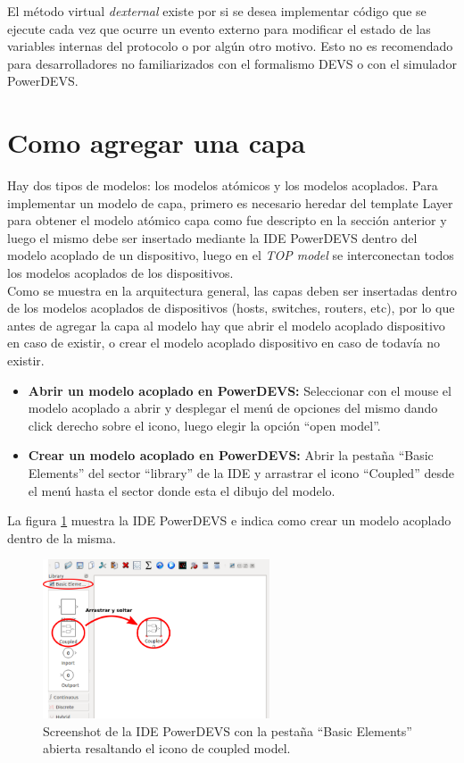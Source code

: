 \documentclass[10pt,a4paper]{article}
\begin{document}
El método virtual \textit{dexternal} existe por si se desea implementar código que se ejecute cada vez que ocurre un evento externo para modificar el estado de las variables internas del protocolo o por algún otro motivo. Esto no es recomendado para desarrolladores no familiarizados con el formalismo DEVS o con el simulador PowerDEVS. \\

\section{Como agregar una capa}

Hay dos tipos de modelos: los modelos atómicos y los modelos acoplados. Para implementar un modelo de capa, primero es necesario heredar del template Layer para obtener el modelo atómico capa como fue descripto en la sección anterior y luego el mismo debe ser insertado mediante la IDE PowerDEVS dentro del modelo acoplado de un dispositivo, luego en el \textit{TOP model} se interconectan todos los modelos acoplados de los dispositivos. \\

Como se muestra en la arquitectura general, las capas deben ser insertadas dentro de los modelos acoplados de dispositivos (hosts, switches, routers, etc), por lo que antes de agregar la capa al modelo hay que abrir el modelo acoplado dispositivo en caso de existir, o crear el modelo acoplado dispositivo en caso de todavía no existir.

\begin{itemize}
\item \textbf{Abrir un modelo acoplado en PowerDEVS:} Seleccionar con el mouse el modelo acoplado a abrir y desplegar el menú de opciones del mismo dando click derecho sobre el icono, luego elegir la opción ``open model''.
\item \textbf{Crear un modelo acoplado en PowerDEVS: } Abrir la pestaña ``Basic Elements'' del sector ``library'' de la IDE y arrastrar el icono ``Coupled'' desde el menú hasta el sector donde esta el dibujo del modelo.
\end{itemize}

La figura \ref{figure: PowerDEVS IDE} muestra la IDE PowerDEVS e indica como crear un modelo acoplado dentro de la misma. \\

\begin{figure}[htbp]
    \centering
    \includegraphics[width = 0.6\textwidth]{img/png/powerDEVS_coupled.png}
    \caption{Screenshot de la IDE PowerDEVS con la pestaña ``Basic Elements'' abierta resaltando el icono de coupled model.}
    \label{figure: PowerDEVS IDE}
\end{figure}
\end{document}
